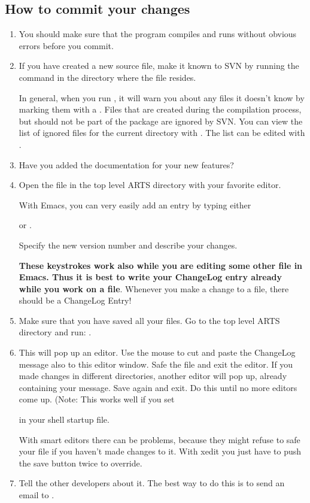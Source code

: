 \subsection{How to commit your changes}
\begin{enumerate}
\item You should make sure that the program compiles and runs without
  obvious errors before you commit.
\item If you have created a new source file, make it known to SVN by
  running the command  in the directory where
  the file resides.
  
  In general, when you run , it will warn you about
  any files it doesn't know by marking them with a . Files
  that are created during the compilation process, but should not be
  part of the package are ignored by SVN. You can view the list of ignored
  files for the current directory with .
  The list can be edited with .
\item Have you added the documentation for your new features?
\item Open the file  in the top level ARTS directory
  with your favorite editor.
  
  With Emacs, you can very easily add an entry by typing either
  \begin{quote}
  \end{quote}
  or .
  
  Specify the new version number and describe your changes.

  \textbf{These keystrokes work also while you are editing some other
    file in Emacs. Thus it is best to write your ChangeLog entry
    already while you work on a file}. Whenever you make a change to a
  file, there should be a ChangeLog Entry!
\item Make sure that you have saved all your files. Go to the top
  level ARTS directory and run: .
\item This will pop up an editor. Use the mouse to cut and paste the
  ChangeLog message also to this editor window. Safe the file and exit
  the editor. If you made changes in different directories, another
  editor will pop up, already containing your message. Save again and
  exit. Do this until no more editors come up. (Note: This works well
  if you set
  \begin{quote}
  \end{quote}
  in your shell startup file.
 
  With smart editors there can be problems, because they might
  refuse to safe your file if you haven't made changes to it. With
  xedit you just have to push the save button twice to override.
\item Tell the other developers about it. The best way to do this is
  to send an email to .
\end{enumerate}


